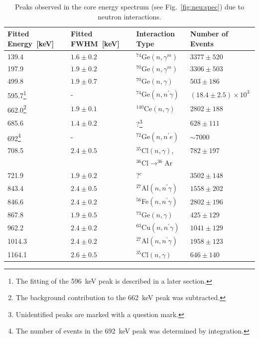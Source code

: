 \begin{table}[tbhp]
  \caption{Peaks observed in the core energy spectrum (see
Fig.~\ref{fig:neu:spec})
    due to neutron interactions.} 
  \label{tab:neu:peak}\centering
  \begin{minipage}{\linewidth}
    \begin{tabular*}{\textwidth}{llll} \hline
      Fitted Energy~[keV]& Fitted FWHM~[keV]& Interaction Type& Number of Events\\\hline
      139.4 & $1.6 \pm 0.2$ & $^{74}$Ge$(n,\gamma^m)$ & $3377 \pm 520$
\\
      197.9 & $1.9 \pm 0.2$ & $^{70}$Ge$(n,\gamma^m)$ & $3306 \pm 503$
\\
      499.8 & $1.9 \pm 0.7$ & $^{70}$Ge$(n,\gamma)$   & $503  \pm 186$
\\
      595.7\footnote{The fitting of the 596~keV peak is described in a
        later section.}
      & - & $^{74}$Ge$(n,n^\prime\gamma)$ & $(18.4 \pm 2.5)\times10^3$
\\
      662.0\footnote{The background contribution to the 662~keV peak
        was subtracted.}
      & $1.9 \pm 0.1$ & $^{140}$Ce$(n,\gamma)$ & $2802 \pm 188$ \\
      685.6 & $1.4 \pm 0.2$ & ?\footnote{Unidentified peaks are
        marked with a question mark.} & $628  \pm 111$ \\
      692\footnote{The number of events in the 692~keV peak was
        determined by integration.}  & - & $^{72}$Ge$(n,n^\prime e)$ &
      $\sim 7000$
      \\
      708.5  & $2.4 \pm 0.5$ & $^{35}$Cl$(n,\gamma)$,       & $782 
\pm 197$ \\
      &  & $^{36}$Cl$\rightarrow^{36}$Ar & \\
      721.9  & $1.9 \pm 0.2$ & ?$^c$ & $3502 \pm 148$ \\
      843.4  & $2.4 \pm 0.5$ & $^{27}$Al$(n,n^\prime\gamma)$ & $1558
\pm 202$ \\
      846.6  & $2.4 \pm 0.2$ & $^{56}$Fe$(n,n^\prime\gamma)$ & $2802
\pm 196$ \\
      867.8  & $1.9 \pm 0.5$ & $^{73}$Ge$(n,\gamma)$        & $425 
\pm 129$ \\
      962.2  & $2.4 \pm 0.2$ & $^{63}$Cu$(n,n^\prime\gamma)$ & $1041
\pm 129$ \\
      1014.3 & $2.4 \pm 0.2$ & $^{27}$Al$(n,n^\prime\gamma)$ & $1958
\pm 123$ \\
      1164.1 & $2.6 \pm 0.5$ & $^{35}$Cl$(n,\gamma)$        & $646 
\pm 140$ \\

\end{tabular*}
\end{minipage}
\end{table}
